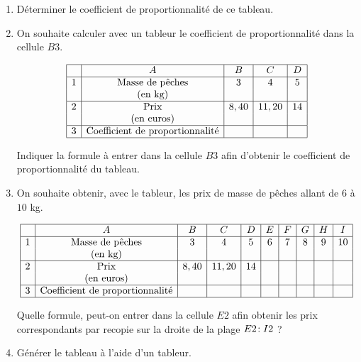 \documentclass{article}
\begin{document}
\begin{enumerate}[leftmargin=0cm,itemindent=.5cm,labelwidth=\itemindent,labelsep=0cm,align=left,label=\arabic*)]

\item Déterminer le coefficient de proportionnalité de ce tableau.

\item On souhaite calculer avec un tableur le coefficient de proportionnalité dans la cellule $B3$. 

\begin{equation*}
  \begin{array}{|c|c|c|c|c|}
    \hline
    & A & B & C & D \\
    \hline
    1 & \textrm{Masse de pêches} & 3 & 4 & 5 \\
    & \textrm{(en kg)} & & & \\
    \hline
    2 & \textrm{Prix} & 8,40 & 11,20 & 14 \\
    & \textrm{(en euros)} & & & \\
    \hline
    3 & \textrm{Coefficient de proportionnalité} & & & \\
    \hline
  \end{array}
\end{equation*}
  
  Indiquer la formule à entrer dans la cellule $B3$ afin d'obtenir le coefficient de proportionnalité du tableau.

\item On souhaite obtenir, avec le tableur, les prix de masse de pêches allant de $6$ à $10$ kg.

\begin{equation*}
  \begin{array}{|c|c|c|c|c|c|c|c|c|c|}
    \hline
    & A & B & C & D & E & F & G & H & I\\
    \hline
    1 & \textrm{Masse de pêches} & 3 & 4 & 5 & 6 & 7 & 8 & 9 & 10 \\
    & \textrm{(en kg)} & & & & & & & &\\
    \hline
    2 & \textrm{Prix} & 8,40 & 11,20 & 14 & & & & &\\
    & \textrm{(en euros)} & & & & & & & &\\
    \hline
    3 & \textrm{Coefficient de proportionnalité} & & & & & & & &\\
    \hline
  \end{array}
\end{equation*}


Quelle formule, peut-on entrer dans la cellule $E2$ afin obtenir les prix correspondants par recopie sur la droite de la plage $E2\negthinspace:I2$ ? 
  


\item Générer le tableau à l'aide d'un tableur.

\end{enumerate}
\end{document}
